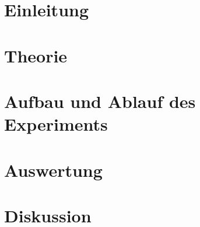 \documentclass[a4,10.5pt]{article}
\newcommand{\V}{V503}
\begin{document}



\tableofcontents
\clearpage

\section{Einleitung}


\section{Theorie}

\clearpage


\section{Aufbau und Ablauf des Experiments}

\clearpage


\section{Auswertung}
%
%

\clearpage

\section{Diskussion}

\clearpage

\listoftodos
\listoffigures
\listoftables
\nocite{\V}
\printbibliography[title = Literaturverzeichnis]

\end{document}

